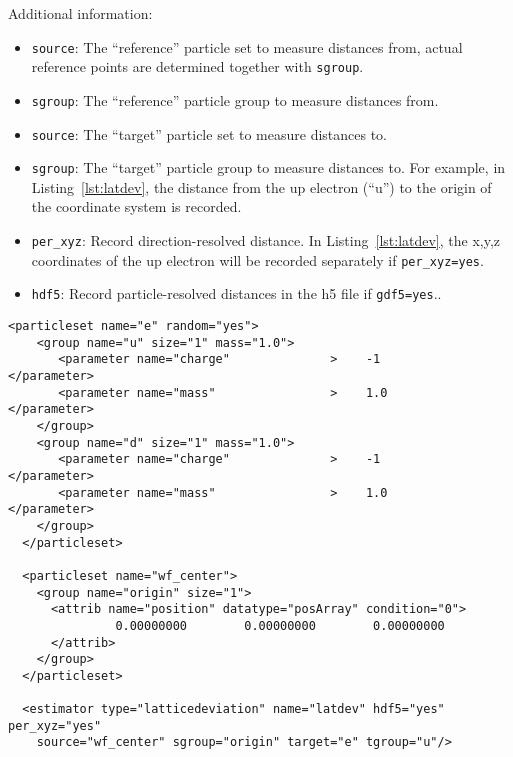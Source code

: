 Additional information:
\begin{itemize}
  \item{\texttt{source}: The ``reference'' particle set to measure distances from, actual reference points are determined together with \verb|sgroup|.}
  \item{\texttt{sgroup}: The ``reference'' particle group to measure distances from.} 
  \item{\texttt{source}: The ``target'' particle set to measure distances to.}
  \item{\texttt{sgroup}: The ``target'' particle group to measure distances to. For example, in Listing~\ref{lst:latdev}, the distance from the up electron (``u'') to the origin of the coordinate system is recorded.}
  \item{\texttt{per\_xyz}: Record direction-resolved distance. In Listing~\ref{lst:latdev}, the x,y,z coordinates of the up electron will be recorded separately if \texttt{per\_xyz=yes}.}
  \item{\texttt{hdf5}: Record particle-resolved distances in the h5 file if \texttt{gdf5=yes}.}.
\end{itemize}

\begin{lstlisting}[caption={Lattice deviation estimator element.},label={lst:latdev}]
  <particleset name="e" random="yes">
    <group name="u" size="1" mass="1.0">
       <parameter name="charge"              >    -1                    </parameter>
       <parameter name="mass"                >    1.0                   </parameter>
    </group>
    <group name="d" size="1" mass="1.0">
       <parameter name="charge"              >    -1                    </parameter>
       <parameter name="mass"                >    1.0                   </parameter>
    </group>
  </particleset>
  
  <particleset name="wf_center">
    <group name="origin" size="1">
      <attrib name="position" datatype="posArray" condition="0">
               0.00000000        0.00000000        0.00000000
      </attrib>
    </group>
  </particleset>
  
  <estimator type="latticedeviation" name="latdev" hdf5="yes" per_xyz="yes"
    source="wf_center" sgroup="origin" target="e" tgroup="u"/>
\end{lstlisting}




